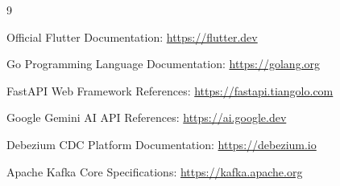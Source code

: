 \documentclass[12pt,a4paper]{report}
\begin{document}
\newpage
\begin{thebibliography}{9}

Official Flutter Documentation: \url{https://flutter.dev}

Go Programming Language Documentation: \url{https://golang.org}

FastAPI Web Framework References: \url{https://fastapi.tiangolo.com}

Google Gemini AI API References: \url{https://ai.google.dev}

Debezium CDC Platform Documentation: \url{https://debezium.io}

Apache Kafka Core Specifications: \url{https://kafka.apache.org}

\end{thebibliography}
\end{document}
